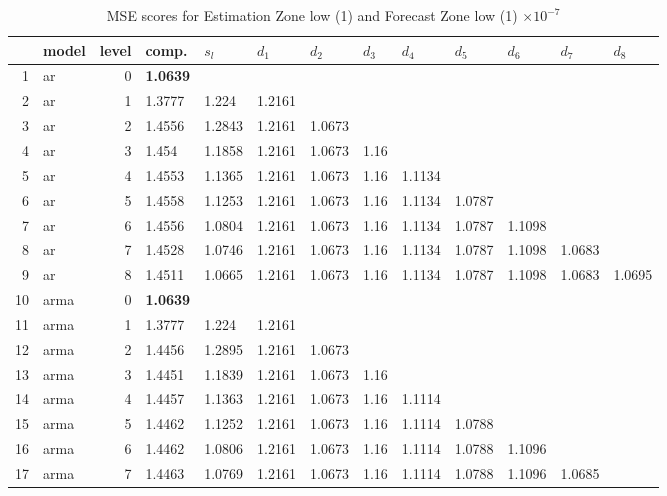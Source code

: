 \documentclass[10pt,a4paper]{article}
\begin{document}
\begin{table}[ht]
\centering
\caption{MSE scores for Estimation Zone low (1) and Forecast Zone low (1) $ \times 10^{-7}$} 
\begin{tabular}{rlrllllllllll}
  \hline
 & model & level & comp. & $s_l$ & $d_1$ & $d_2$ & $d_3$ & $d_4$ & $d_5$ & $d_6$ & $d_7$ & $d_8$ \\ 
  \hline
1 & ar &     0 & \textbf{1.0639} &  &  &  &  &  &  &  &  &  \\ 
  2 & ar &     1 & 1.3777 & 1.224 & 1.2161 &  &  &  &  &  &  &  \\ 
  3 & ar &     2 & 1.4556 & 1.2843 & 1.2161 & 1.0673 &  &  &  &  &  &  \\ 
  4 & ar &     3 & 1.454 & 1.1858 & 1.2161 & 1.0673 & 1.16 &  &  &  &  &  \\ 
  5 & ar &     4 & 1.4553 & 1.1365 & 1.2161 & 1.0673 & 1.16 & 1.1134 &  &  &  &  \\ 
  6 & ar &     5 & 1.4558 & 1.1253 & 1.2161 & 1.0673 & 1.16 & 1.1134 & 1.0787 &  &  &  \\ 
  7 & ar &     6 & 1.4556 & 1.0804 & 1.2161 & 1.0673 & 1.16 & 1.1134 & 1.0787 & 1.1098 &  &  \\ 
  8 & ar &     7 & 1.4528 & 1.0746 & 1.2161 & 1.0673 & 1.16 & 1.1134 & 1.0787 & 1.1098 & 1.0683 &  \\ 
  9 & ar &     8 & 1.4511 & 1.0665 & 1.2161 & 1.0673 & 1.16 & 1.1134 & 1.0787 & 1.1098 & 1.0683 & 1.0695 \\ 
   \hline
10 & arma &     0 & \textbf{1.0639} &  &  &  &  &  &  &  &  &  \\ 
  11 & arma &     1 & 1.3777 & 1.224 & 1.2161 &  &  &  &  &  &  &  \\ 
  12 & arma &     2 & 1.4456 & 1.2895 & 1.2161 & 1.0673 &  &  &  &  &  &  \\ 
  13 & arma &     3 & 1.4451 & 1.1839 & 1.2161 & 1.0673 & 1.16 &  &  &  &  &  \\ 
  14 & arma &     4 & 1.4457 & 1.1363 & 1.2161 & 1.0673 & 1.16 & 1.1114 &  &  &  &  \\ 
  15 & arma &     5 & 1.4462 & 1.1252 & 1.2161 & 1.0673 & 1.16 & 1.1114 & 1.0788 &  &  &  \\ 
  16 & arma &     6 & 1.4462 & 1.0806 & 1.2161 & 1.0673 & 1.16 & 1.1114 & 1.0788 & 1.1096 &  &  \\ 
  17 & arma &     7 & 1.4463 & 1.0769 & 1.2161 & 1.0673 & 1.16 & 1.1114 & 1.0788 & 1.1096 & 1.0685 &  \\ 

\end{tabular}
\end{table}
\end{document}
